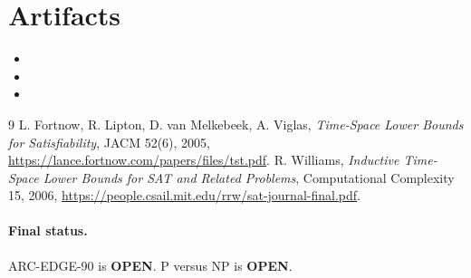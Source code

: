 \documentclass[11pt]{article}
\newcommand{\OPEN}{\textbf{OPEN}}
\begin{document}
\section{Artifacts}
\begin{itemize}
\item {}
\item {}
\item {}
\end{itemize}

\begin{thebibliography}{9}
 L. Fortnow, R. Lipton, D. van Melkebeek, A. Viglas,
\emph{Time-Space Lower Bounds for Satisfiability}, JACM 52(6), 2005,
\url{https://lance.fortnow.com/papers/files/tst.pdf}.
 R. Williams, \emph{Inductive Time-Space Lower Bounds for
SAT and Related Problems}, Computational Complexity 15, 2006,
\url{https://people.csail.mit.edu/rrw/sat-journal-final.pdf}.
\end{thebibliography}

\paragraph{Final status.}
ARC-EDGE-90 is \OPEN{}.  P versus NP is \OPEN{}.
\end{document}
